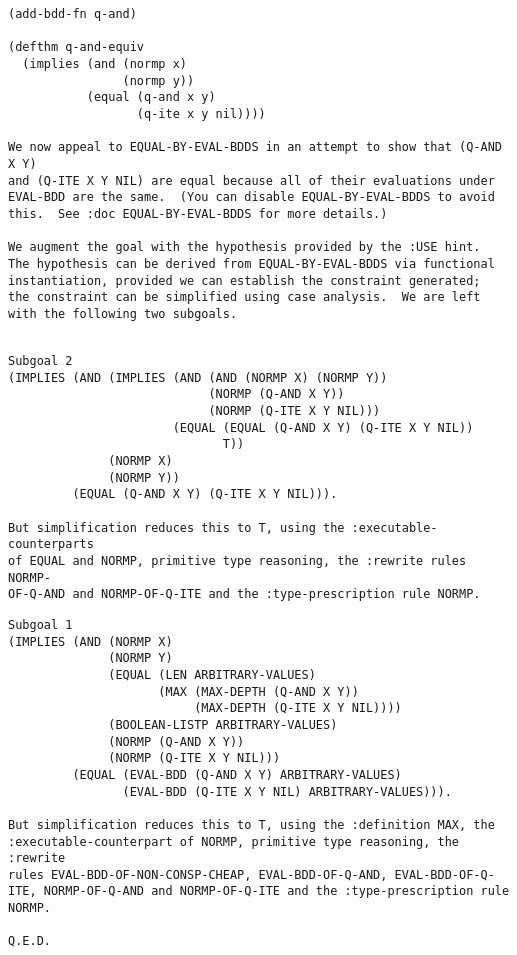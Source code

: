 \begin{frame}[fragile]

{\footnotesize \begin{verbatim}
(add-bdd-fn q-and)

(defthm q-and-equiv
  (implies (and (normp x)
                (normp y))
           (equal (q-and x y)
                  (q-ite x y nil))))

We now appeal to EQUAL-BY-EVAL-BDDS in an attempt to show that (Q-AND X Y)
and (Q-ITE X Y NIL) are equal because all of their evaluations under
EVAL-BDD are the same.  (You can disable EQUAL-BY-EVAL-BDDS to avoid
this.  See :doc EQUAL-BY-EVAL-BDDS for more details.)

We augment the goal with the hypothesis provided by the :USE hint.
The hypothesis can be derived from EQUAL-BY-EVAL-BDDS via functional
instantiation, provided we can establish the constraint generated;
the constraint can be simplified using case analysis.  We are left
with the following two subgoals.
\end{verbatim}}

\end{frame}




\begin{frame}[fragile]

{\footnotesize \begin{verbatim}

Subgoal 2
(IMPLIES (AND (IMPLIES (AND (AND (NORMP X) (NORMP Y))
                            (NORMP (Q-AND X Y))
                            (NORMP (Q-ITE X Y NIL)))
                       (EQUAL (EQUAL (Q-AND X Y) (Q-ITE X Y NIL))
                              T))
              (NORMP X)
              (NORMP Y))
         (EQUAL (Q-AND X Y) (Q-ITE X Y NIL))).

But simplification reduces this to T, using the :executable-counterparts
of EQUAL and NORMP, primitive type reasoning, the :rewrite rules NORMP-
OF-Q-AND and NORMP-OF-Q-ITE and the :type-prescription rule NORMP.

\end{verbatim}}
\end{frame}


\begin{frame}[fragile]

{\footnotesize \begin{verbatim}
Subgoal 1
(IMPLIES (AND (NORMP X)
              (NORMP Y)
              (EQUAL (LEN ARBITRARY-VALUES)
                     (MAX (MAX-DEPTH (Q-AND X Y))
                          (MAX-DEPTH (Q-ITE X Y NIL))))
              (BOOLEAN-LISTP ARBITRARY-VALUES)
              (NORMP (Q-AND X Y))
              (NORMP (Q-ITE X Y NIL)))
         (EQUAL (EVAL-BDD (Q-AND X Y) ARBITRARY-VALUES)
                (EVAL-BDD (Q-ITE X Y NIL) ARBITRARY-VALUES))).

But simplification reduces this to T, using the :definition MAX, the
:executable-counterpart of NORMP, primitive type reasoning, the :rewrite
rules EVAL-BDD-OF-NON-CONSP-CHEAP, EVAL-BDD-OF-Q-AND, EVAL-BDD-OF-Q-
ITE, NORMP-OF-Q-AND and NORMP-OF-Q-ITE and the :type-prescription rule
NORMP.

Q.E.D.
\end{verbatim}}
\end{frame}
